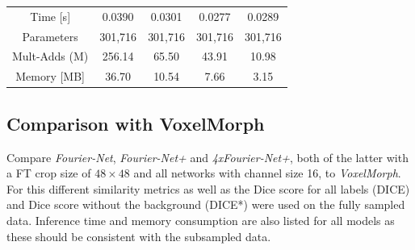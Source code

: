 \documentclass[english,version-2022-01]{uzl-thesis} %
\begin{document}
\begin{table}[h]
\begin{tabular}{c c c c c}
		Time [s] 	 & 0.0390  & 0.0301  & 0.0277  & 0.0289 \\
		Parameters 	 & 301,716 & 301,716 & 301,716 & 301,716 \\
		Mult-Adds (M)& 256.14  & 65.50   & 43.91   & 10.98 \\
		Memory [MB] 	 & 36.70   & 10.54   & 7.66    & 3.15 \\
		\bottomrule
	\end{tabular}
\end{table}

\subsection{Comparison with VoxelMorph} \label{SubSec:ResultsComparisonVoxelMorph}
Compare \emph{Fourier-Net}, \emph{Fourier-Net+} and \emph{4xFourier-Net+}, both of the latter with a FT crop size of $48 \times 48$ and all networks with channel size 16, to \emph{VoxelMorph}. For this different similarity metrics as well as the Dice score for all labels (DICE) and Dice score without the background (DICE*) were used on the fully sampled data. Inference time and memory consumption are also listed for all models as these should be consistent with the subsampled data. 
\end{document}
